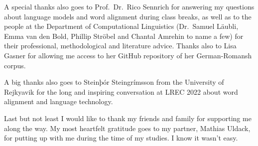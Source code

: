 A special thanks also goes to Prof.~Dr.~Rico Sennrich for answering my questions about language models and word alignment during class breaks, as well as to the people at the Department of Computational Linguistics (Dr.~Samuel Läubli, Emma van den Bold,  Phillip Ströbel and Chantal Amrehin to name a few) for their professional, methodological and literature advice. 
Thanks also to Lisa Gasner for allowing me access to her GitHub repository of her German-Romansh corpus.

A big thanks also goes to Steinþór Steingrímsson from the University of Rejkyavik for the long and inspiring conversation at LREC 2022 about word alignment and language technology.

Last but not least I would like to thank my friends and family for supporting me along the way. My most heartfelt gratitude goes to my partner, Mathias Uldack, for putting up with me during the time of my studies. 
I know it wasn't easy.


